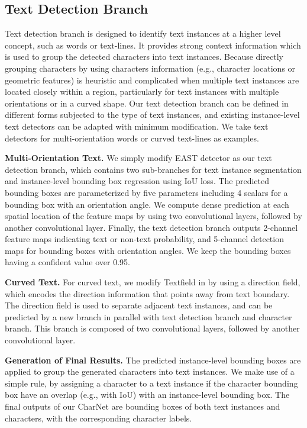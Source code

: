 \documentclass[10pt,twocolumn,letterpaper]{article}
\begin{document}
\subsection{Text Detection Branch}
Text detection branch is designed to identify text instances at a higher level concept, such as words or text-lines. It provides strong context information which is used to group the detected characters into text instances. Because directly grouping characters by using characters information (e.g., character locations or geometric features) is heuristic and complicated when multiple text instances are located closely within a region, particularly for text instances with multiple orientations or in a curved shape.
Our text detection branch can be defined in different forms subjected to the type of text instances, and existing instance-level text detectors can be adapted with minimum modification. We take text detectors for multi-orientation words or curved text-lines as examples.

\textbf{Multi-Orientation Text.} We simply modify EAST detector \cite{zhou2017east} as our text detection branch, which contains two sub-branches for text instance segmentation and instance-level bounding box regression using IoU loss. The predicted bounding boxes are parameterized by five parameters including 4 scalars for a bounding box with an orientation angle. We compute dense prediction at each spatial location of the feature maps by using two  convolutional layers, followed by another  convolutional layer. Finally, the text detection branch outputs 2-channel feature maps indicating text or non-text probability, and 5-channel detection maps for bounding boxes with orientation angles. We keep the bounding boxes having a confident value over 0.95.



\textbf{Curved Text.}
For curved text, we modify Textfield in \cite{xu2019textfield} by using a direction field, which encodes the direction information that points away from text boundary. The direction field is used to separate adjacent text instances, and can be predicted by a new branch in parallel with text detection branch and character branch. This branch is composed of two  convolutional layers, followed by another  convolutional layer.

\textbf{Generation of Final Results.} The predicted instance-level bounding boxes are applied to group the generated characters into text instances. We make use of a simple rule, by assigning a character to a text instance if the character bounding box have an overlap (e.g., with  IoU) with an instance-level bounding box. The final outputs of our CharNet are bounding boxes of both text instances and characters, with the corresponding character labels.
\end{document}

